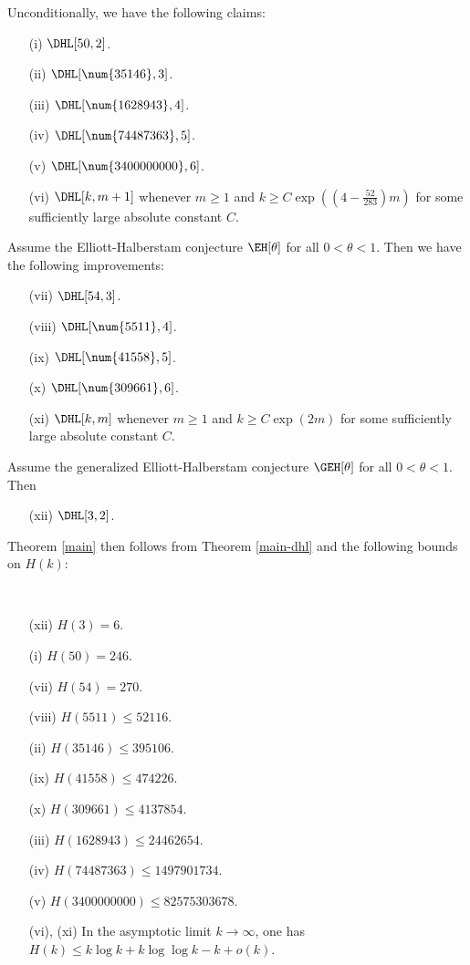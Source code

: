 \begin{theorem}\label{main-dhl} Unconditionally, we have the following claims:
\begin{itemize}
\item[(i)] $\DHL[50,2]$.   
\item[(ii)] $\DHL[\num{35146},3]$.
\item[(iii)] $\DHL[\num{1628943},4]$. 
\item[(iv)] $\DHL[\num{74487363},5]$.  
\item[(v)] $\DHL[\num{3400000000},6]$.
\item[(vi)] $\DHL[k,m+1]$ whenever $m \geq 1$ and $k \geq C\exp( (4 - \frac{52}{283}) m )$ for some sufficiently large absolute constant $C$.
\end{itemize}
Assume the Elliott-Halberstam conjecture $\EH[\theta]$ for all $0 < \theta < 1$.  Then we have the following improvements:
\begin{itemize}
\item[(vii)] $\DHL[54,3]$.
\item[(viii)] $\DHL[\num{5511},4]$.
\item[(ix)] $\DHL[\num{41558},5]$.
\item[(x)] $\DHL[\num{309661},6]$.
\item[(xi)] $\DHL[k,m]$ whenever $m \geq 1$ and $k \geq C\exp( 2 m )$ for some sufficiently large absolute constant $C$.
\end{itemize}
Assume the generalized Elliott-Halberstam conjecture $\GEH[\theta]$ for all $0 < \theta < 1$.  Then
\begin{itemize}
\item[(xii)] $\DHL[3,2]$.
\end{itemize}
\end{theorem}

Theorem \ref{main} then follows from Theorem \ref{main-dhl} and the following bounds on $H(k)$:

\begin{theorem}[Bounds on $H(k)$]\label{hk-bound}\ 
\begin{itemize}
\item[(xii)] $H(3)=6$.
\item[(i)] $H(50) = 246$.
\item[(vii)] $H(54) = 270$.
\item[(viii)] $H(\num{5511}) \leq \num{52116}$.
\item[(ii)] $H(\num{35146}) \leq \num{395106}$.
\item[(ix)] $H(\num{41558}) \leq \num{474226}$.
\item[(x)] $H(\num{309661}) \leq \num{4137854}$.
\item[(iii)] $H(\num{1628943}) \leq \num{24462654}$.
\item[(iv)] $H(\num{74487363}) \leq \num{1497901734}$.
\item[(v)] $H(\num{3400000000}) \leq \num{82575303678}$.
\item[(vi), (xi)] In the asymptotic limit $k \to \infty$, one has $H(k) \leq k \log k + k \log\log k - k + o(k)$.
\end{itemize}
\end{theorem}

